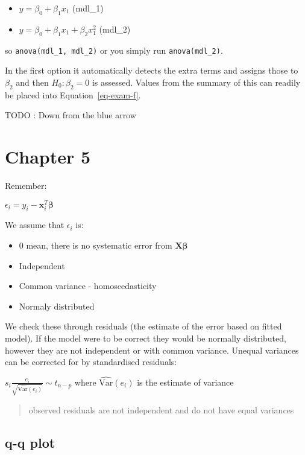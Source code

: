 \documentclass[
  letterpaper,
  DIV=11,
  numbers=noendperiod]{scrreprt}
\providecommand{\tightlist}{%
  \setlength{\itemsep}{0pt}\setlength{\parskip}{0pt}}\usepackage{longtable,booktabs,array}
\begin{document}
\begin{itemize}
\tightlist
\item
  \(y = \beta_0 + \beta_1x_1\) (mdl\_1)
\item
  \(y = \beta_0 + \beta_1x_1 + \beta_2x_1^2\) (mdl\_2)
\end{itemize}

so \texttt{anova(mdl\_1,\ mdl\_2)} or you simply run
\texttt{anova(mdl\_2)}.

In the first option it automatically detects the extra terms and assigns
those to \(\beta_2\) and then \(H_0: \beta_2 = 0\) is assessed. Values
from the summary of this can readily be placed into
Equation~\ref{eq-exam-f}.

TODO : Down from the blue arrow

\hypertarget{chapter-5}{%
\section{Chapter 5}\label{chapter-5}}

Remember:

\(\epsilon_i = y_i - \textbf{x}_i^T\boldsymbol{\beta}\)

We assume that \(\epsilon_i\) is:

\begin{itemize}
\tightlist
\item
  0 mean, there is no systematic error from
  \(\textbf{X}\boldsymbol{\beta}\)
\item
  Independent
\item
  Common variance - homoscedasticity
\item
  Normaly distributed
\end{itemize}

We check these through residuals (the estimate of the error based on
fitted model). If the model were to be correct they would be normally
distributed, however they are not independent or with common variance.
Unequal variances can be corrected for by standardised residuals:

\(s_i \frac{e_i}{\sqrt{\hat{\text{Var}}(e_i)}} \sim t_{n-p}\) where
\(\hat{\text{Var}}(e_i)\) is the estimate of variance

\begin{quote}
observed residuals are not independent and do not have equal variances
\end{quote}

\hypertarget{q-q-plot}{%
\subsection{q-q plot}\label{q-q-plot}}
\end{document}
